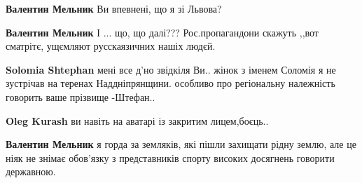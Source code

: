 \begin{itemize}
\begin{itemize}
 
\textbf{Валентин Мельник} Ви впевнені, що я зі Львова?

 
\textbf{Валентин Мельник} І ... що, що далі??? Рос.пропагандони скажуть ,,вот сматрітє, ущємляют русскаязичних нашіх людєй.

 
\textbf{Solomia Shtephan} мені все д'но звідкіля Ви.. жінок з іменем Соломія я не зустрічав на теренах Наддніпрянщини. особливо про регіональну належність говорить ваше прізвище -Штефан..

 
\textbf{Oleg Kurash} ви навіть на аватарі із закритим лицем,боєць..

 
\textbf{Валентин Мельник} я горда за земляків, які пішли захищати рідну землю, але це ніяк не знімає обов'язку з представників спорту високих досягнень говорити державною.

 

\end{itemize}
\end{itemize}

